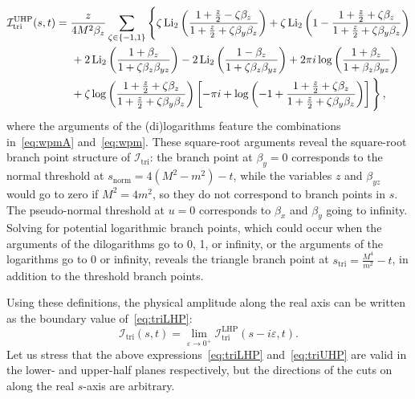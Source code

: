 \documentclass[12pt]{article}
\numberwithin{figure}{section}
\def \be {\begin{equation}}
\def \ee {\end{equation}}
\def \eps {\varepsilon}
\def \I {\mathcal{I}}
\def \triangle {\mathrm{tri}}
\def \normal {\mathrm{norm}}
\def \Li {\mathrm{Li}}
\def \UHP {\mathrm{UHP}}
\def \LHP {\mathrm{LHP}}
\begin{document}
    \be
    \begin{aligned}
    \mathcal{I}_\triangle^{\UHP} (s,t) & = \frac{z}{4 M^2 \beta_z} 
        \sum_{\zeta \in \{-1,1\}} \Bigg\{
        \zeta \, \Li_2 \left( \frac{1+\frac{z}{2} - \zeta \beta_z}{1+ \frac{z}{2} + \zeta \beta_y \beta_z } \right)
        +
        \zeta \,
        \Li_2 \left(1- \frac{1+\frac{z}{2} + \zeta \beta_z}{1+ \frac{z}{2} + \zeta \beta_y \beta_z } \right) 
        \\ 
        & \hspace{0.5cm}
        +2 \, \Li_2 \left( \frac{1 + \beta_z}{1 + \zeta \beta_z \beta_{yz}} \right)  - 2 \, \Li_2 \left( \frac{1-\beta_z}{1 + \zeta \beta_z \beta_{yz}} \right) 
        +
        2 \pi i \log \left( \frac{1+\beta_z}{1+\beta_z \beta_{yz}} \right)
        \\ 
        & \hspace{0.5cm}
        + \zeta
        \log \left( \frac{1+\frac{z}{2}+\zeta \beta_z}{1+\frac{z}{2}+\zeta \beta_y \beta_z} \right) \left[-\pi i + \log \left( -1 + \frac{1+ \frac{z}{2}+ \zeta \beta_z}{1+\frac{z}{2}+ \zeta \beta_y \beta_z} \right) \right]
        \Bigg\} \, ,
    \label{eq:triUHP}
    \end{aligned}
    \ee
    where the arguments of the (di)logarithms feature the combinations in~\eqref{eq:wpmA} and~\eqref{eq:wpm}.
	These square-root arguments reveal the square-root branch point structure of $\I_\triangle$: the branch point at $\beta_y=0$ corresponds to the normal threshold at $s_{\normal} = 4(M^2 - m^2) - t$, while the variables $z$ and $\beta_{yz}$ would go to zero if $M^2=4 m^2$, so they do not correspond to branch points in $s$. The pseudo-normal threshold at $u=0$ corresponds to $\beta_x$ and $\beta_y$ going to infinity. Solving for potential logarithmic branch points, which could occur when the arguments of the dilogarithms go to 0, 1, or infinity, or the arguments of the logarithms go to 0 or infinity, reveals the triangle branch point at $s_{\triangle} = \frac{M^4}{m^2} - t$, in addition to the threshold branch points.
	
	Using these definitions, the physical amplitude along the real axis can be written as the boundary value of~\eqref{eq:triLHP}:
	\be\label{eq:tri-limit}
	\boxed{
	\I_{\triangle}(s,t) = \lim_{\eps \to 0^+} \I^{\LHP}_{\triangle} (s-i\eps, t).}
	\ee
	Let us stress that the above expressions~\eqref{eq:triLHP} and~\eqref{eq:triUHP} are valid in the lower- and upper-half planes respectively, but the directions of the cuts on along the real $s$-axis are arbitrary.
	
\end{document}
